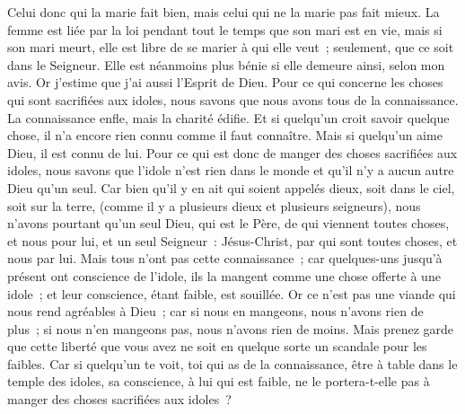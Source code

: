 \begin{multicols}{2}
Celui donc qui la marie fait bien, mais celui qui ne la marie pas fait mieux.
La femme est liée par la loi pendant tout le temps que son mari est en vie, mais si son mari meurt, elle est libre de se marier à qui elle veut~; seulement, que ce soit dans le Seigneur.
Elle est néanmoins plus bénie si elle demeure ainsi, selon mon avis. Or j'estime que j'ai aussi l'Esprit de Dieu.
\VerseOne{}Pour ce qui concerne les choses qui sont sacrifiées aux idoles, nous savons que nous avons tous de la connaissance. La connaissance enfle, mais la charité édifie.
Et si quelqu'un croit savoir quelque chose, il n'a encore rien connu comme il faut connaître.
Mais si quelqu'un aime Dieu, il est connu de lui.
Pour ce qui est donc de manger des choses sacrifiées aux idoles, nous savons que l'idole n'est rien dans le monde et qu'il n'y a aucun autre Dieu qu'un seul.
Car bien qu'il y en ait qui soient appelés dieux, soit dans le ciel, soit sur la terre, (comme il y a plusieurs dieux et plusieurs seigneurs),
nous n'avons pourtant qu'un seul Dieu, qui est le Père, de qui viennent toutes choses, et nous pour lui, et un seul Seigneur~: Jésus-Christ, par qui sont toutes choses, et nous par lui.
Mais tous n'ont pas cette connaissance~; car quelques-uns jusqu'à présent ont conscience de l'idole, ils la mangent comme une chose offerte à une idole~; et leur conscience, étant faible, est souillée.
Or ce n'est pas une viande qui nous rend agréables à Dieu~; car si nous en mangeons, nous n'avons rien de plus~; si nous n'en mangeons pas, nous n'avons rien de moins.
Mais prenez garde que cette liberté que vous avez ne soit en quelque sorte un scandale pour les faibles.
Car si quelqu'un te voit, toi qui as de la connaissance, être à table dans le temple des idoles, sa conscience, à lui qui est faible, ne le portera-t-elle pas à manger des choses sacrifiées aux idoles~?

\end{multicols}
